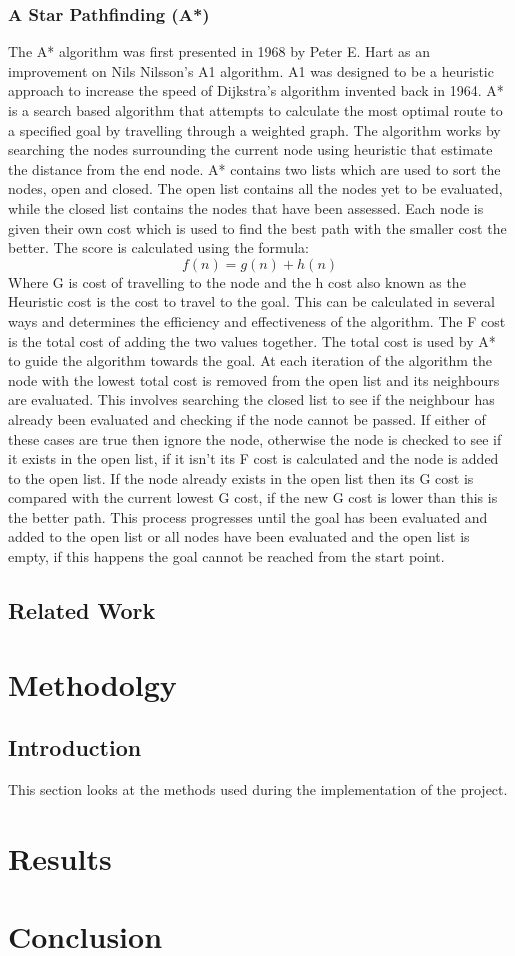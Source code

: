 \documentclass{article}
\begin{document}
\subsubsection{A Star Pathfinding (A*)}
The A* algorithm was first presented in 1968 by Peter E. Hart as an improvement on Nils Nilsson’s A1 algorithm. A1 was designed to be a heuristic approach to increase the speed of Dijkstra’s algorithm invented back in 1964. A* is a search based algorithm that attempts to calculate the most optimal route to a specified goal by travelling through a weighted graph. 
\newline
The algorithm works by searching the nodes surrounding the current node using heuristic that estimate the distance from the end node.  A* contains two lists which are used to sort the nodes, open and closed. The open list contains all the nodes yet to be evaluated, while the closed list contains the nodes that have been assessed. Each node is given their own cost which is used to find the best path with the smaller cost the better. The score is calculated using the formula:
 \[f(n) = g(n) + h(n)\]  
 Where G is cost of travelling to the node and the h cost also known as the Heuristic cost is the cost to travel to the goal. This can be calculated in several ways and determines the efficiency and effectiveness of the algorithm. The F cost is the total cost of adding the two values together.
 \newline
 The total cost is used by A* to guide the algorithm towards the goal. At each iteration of the algorithm the node with the lowest total cost is removed from the open list and its neighbours are evaluated. This involves searching the closed list to see if the neighbour has already been evaluated and checking if the node cannot be passed. If either of these cases are true then ignore the node, otherwise the node is checked to see if it exists in the open list, if it isn’t its F cost is calculated and the node is added to the open list. If the node already exists in the open list then its G cost is compared with the current lowest G cost, if the new G cost is lower than this is the better path. This process progresses until the goal has been evaluated and added to the open list or all nodes have been evaluated and the open list is empty, if this happens the goal cannot be reached from the start point.
 \newline
\subsection{Related Work}
\section{Methodolgy}
\subsection{Introduction}
This section looks at the methods used during the implementation of the project. 
\section{Results}

\section{Conclusion}




\end{document}
